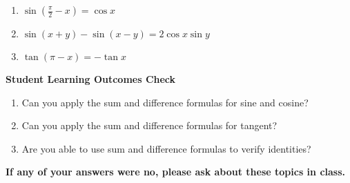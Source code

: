 \documentclass[11pt]{article}
\begin{document}
\begin{enumerate}
\begin{enumerate}
\item $\sin \left(\frac{\pi}{2}-x\right)=\cos x$
\vfill

\item $\sin(x+y)-\sin(x-y) = 2 \cos x \sin y$
\vfill

\item $\tan(\pi-x)=-\tan x$
\vfill


\end{enumerate}



\end{enumerate}

\noindent \textbf{Student Learning Outcomes Check}

\begin{enumerate}
\item Can you apply the sum and difference formulas for sine and cosine?
\item Can you apply the sum and difference formulas for tangent?
\item Are you able to use sum and difference formulas to verify identities?
\end{enumerate}

\noindent \textbf{If any of your answers were no, please ask about these topics in class.}
\end{document}
